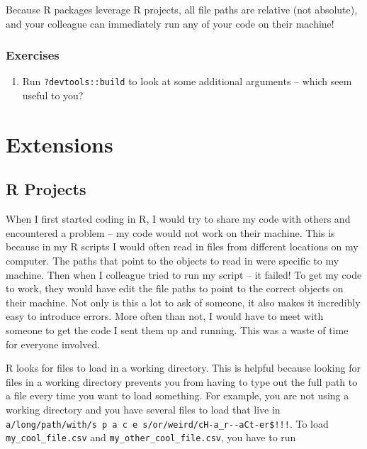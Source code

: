 \documentclass[
]{book}
\providecommand{\tightlist}{%
  \setlength{\itemsep}{0pt}\setlength{\parskip}{0pt}}
\begin{document}
Because R packages leverage R projects, all file paths are relative (not absolute), and your colleague can immediately run any of your code on their machine!

\hypertarget{exercises-8}{%
\subsection{Exercises}\label{exercises-8}}

\begin{enumerate}
\def\labelenumi{\arabic{enumi}.}
\tightlist
\item
  Run \texttt{?devtools::build} to look at some additional arguments -- which seem useful to you?
\end{enumerate}

\hypertarget{extensions}{%
\chapter{Extensions}\label{extensions}}

\hypertarget{r-projects}{%
\section{R Projects}\label{r-projects}}

When I first started coding in R, I would try to share my code with others and encountered a problem -- my code would not work on their machine. This is because in my R scripts I would often read in files from different locations on my computer. The paths that point to the objects to read in were specific to my machine. Then when I colleague tried to run my script -- it failed! To get my code to work, they would have edit the file paths to point to the correct objects on their machine. Not only is this a lot to ask of someone, it also makes it incredibly easy to introduce errors. More often than not, I would have to meet with someone to get the code I sent them up and running. This was a waste of time for everyone involved.

R looks for files to load in a working directory. This is helpful because looking for files in a working directory prevents you from having to type out the full path to a file every time you want to load something. For example, you are not using a working directory and you have several files to load that live in \texttt{a/long/path/with/s\ p\ a\ c\ e\ s/or/weird/cH-a\_r-\/-aCt-er\$!!!}. To load \texttt{my\_cool\_file.csv} and \texttt{my\_other\_cool\_file.csv}, you have to run
\end{document}
